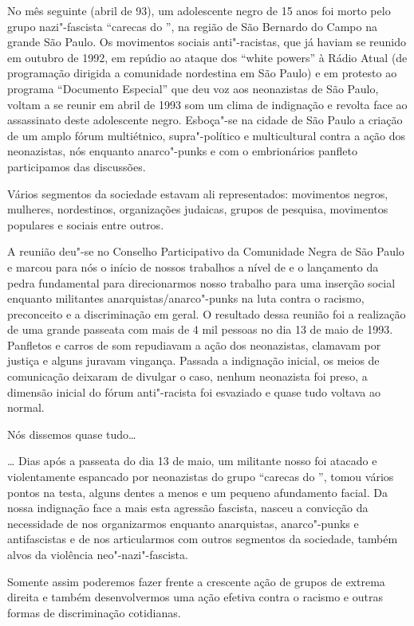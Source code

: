 No mês seguinte (abril de 93), um adolescente negro de 15 anos foi morto pelo grupo nazi"-fascista ``carecas do '', na região de São Bernardo do Campo na grande São Paulo.
Os movimentos sociais anti"-racistas, que já haviam se reunido em outubro de 1992, em repúdio ao ataque dos ``white powers'' à Rádio Atual (de programação dirigida a comunidade nordestina em São Paulo) e em protesto ao programa ``Documento Especial'' que deu voz aos neonazistas de São Paulo, voltam a se reunir em abril de 1993 som um clima de indignação e revolta face ao assassinato deste adolescente negro. Esboça"-se na cidade de São Paulo a criação de um amplo fórum multiétnico, supra"-político e multicultural contra a ação dos neonazistas, nós enquanto anarco"-punks e com o embrionários panfleto participamos das discussões.

Vários segmentos da sociedade estavam ali representados: movimentos negros, mulheres, nordestinos, organizações judaicas, grupos de pesquisa, movimentos populares e sociais entre outros.

A reunião deu"-se no Conselho Participativo da Comunidade Negra de São Paulo e marcou para nós o início de nossos trabalhos a nível de  e o lançamento da pedra fundamental para direcionarmos nosso trabalho para uma inserção social enquanto militantes anarquistas/anarco"-punks na luta contra o racismo, preconceito e a discriminação em geral.
O resultado dessa reunião foi a realização de uma grande passeata com mais de 4 mil pessoas no dia 13 de maio de 1993. Panfletos e carros de som repudiavam a ação dos neonazistas, clamavam por justiça e alguns juravam vingança.
Passada a indignação inicial, os meios de comunicação deixaram de divulgar o caso, nenhum neonazista foi preso, a dimensão inicial do fórum anti"-racista foi esvaziado e quase tudo voltava ao normal.

Nós dissemos quase tudo\ldots{}

\ldots{} Dias após a passeata do dia 13 de maio, um militante nosso foi atacado e violentamente espancado por neonazistas do grupo ``carecas do '', tomou vários pontos na testa, alguns dentes a menos e um pequeno afundamento facial.
Da nossa indignação face a mais esta agressão fascista, nasceu a convicção da necessidade de nos organizarmos enquanto anarquistas, anarco"-punks e antifascistas e de nos articularmos com outros segmentos da sociedade, também alvos da violência neo"-nazi"-fascista.

Somente assim poderemos fazer frente a crescente ação de grupos de extrema direita e também desenvolvermos uma ação efetiva contra o racismo e outras formas de discriminação cotidianas.

